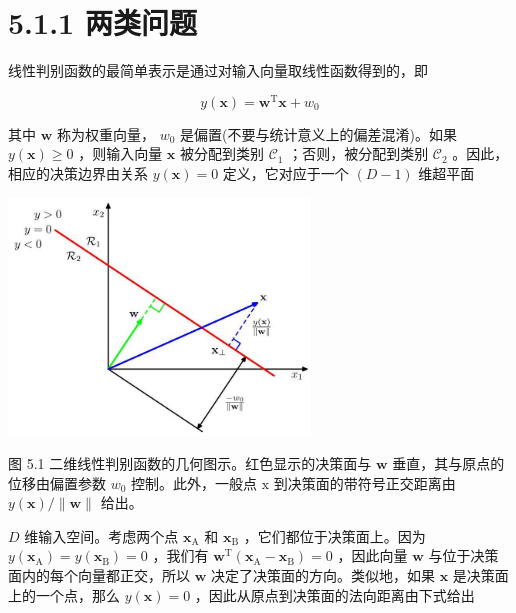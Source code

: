 \documentclass[10pt]{article}
\begin{document}
\section*{5.1.1 两类问题}

线性判别函数的最简单表示是通过对输入向量取线性函数得到的，即

\[
y\left( \mathbf{x}\right)  = {\mathbf{w}}^{\mathrm{T}}\mathbf{x} + {w}_{0} \tag{5.2}
\]

其中 \(\mathbf{w}\) 称为权重向量， \({w}_{0}\) 是偏置(不要与统计意义上的偏差混淆)。如果 \(y\left( \mathbf{x}\right)  \geq  0\) ，则输入向量 \(\mathbf{x}\) 被分配到类别 \({\mathcal{C}}_{1}\) ；否则，被分配到类别 \({\mathcal{C}}_{2}\) 。因此，相应的决策边界由关系 \(y\left( \mathbf{x}\right)  = 0\) 定义，它对应于一个 \(\left( {D - 1}\right)\) 维超平面

\begin{center}
\includegraphics[max width=0.6\textwidth]{images/0194e279-9b28-703a-88f4-c3ac21e2010d_152_769_344_782_615_0.jpg}
\end{center}
\hspace*{3em} 

图 5.1 二维线性判别函数的几何图示。红色显示的决策面与 \(\mathbf{w}\) 垂直，其与原点的位移由偏置参数 \({w}_{0}\) 控制。此外，一般点 \(\mathrm{x}\) 到决策面的带符号正交距离由 \(y\left( \mathbf{x}\right) /\parallel \mathbf{w}\parallel\) 给出。

\(D\) 维输入空间。考虑两个点 \({\mathbf{x}}_{\mathrm{A}}\) 和 \({\mathbf{x}}_{\mathrm{B}}\) ，它们都位于决策面上。因为 \(y\left( {\mathbf{x}}_{\mathrm{A}}\right)  = y\left( {\mathbf{x}}_{\mathrm{B}}\right)  = 0\) ，我们有 \({\mathbf{w}}^{\mathrm{T}}\left( {{\mathbf{x}}_{\mathrm{A}} - {\mathbf{x}}_{\mathrm{B}}}\right)  = 0\) ，因此向量 \(\mathbf{w}\) 与位于决策面内的每个向量都正交，所以 \(\mathbf{w}\) 决定了决策面的方向。类似地，如果 \(\mathbf{x}\) 是决策面上的一个点，那么 \(y\left( \mathbf{x}\right)  = 0\) ，因此从原点到决策面的法向距离由下式给出
\end{document}
